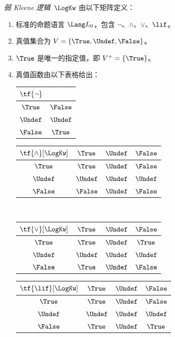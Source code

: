 \documentclass[../../../include/open-logic-section]{subfiles}
\begin{document}
\begin{defn}
\emph{弱 Kleene 逻辑}~$\LogKw$ 由以下矩阵定义：
\begin{enumerate}
  \item 标准的命题语言 $\Lang L_0$，包含
  $\lnot$、$\land$、$\lor$、$\lif$。
  \item 真值集合为 $V = \{\True, \Undef, \False\}$。
  \item $\True$ 是唯一的指定值，即 $V^+ = \{\True\}$。
  \item 真值函数由以下表格给出：
  \begin{center}
    \begin{tabular}{c|c}
      $\tf{\lnot}$ & \\
      \hline
      $\True$ & $\False$ \\
      $\Undef$ & $\Undef$ \\
      $\False$ & $\True$
    \end{tabular}
    \quad
    \begin{tabular}{c|ccc}
      $\tf{\land}[\LogKw]$ & $\True$ & $\Undef$ & $\False$ \\
      \hline
      $\True$ & $\True$ & $\Undef$ & $\False$ \\
      $\Undef$ & $\Undef$ & $\Undef$ & $\Undef$\\
      $\False$ & $\False$ & $\Undef$ & $\False$
    \end{tabular}
    \\[2ex]
    \begin{tabular}{c|ccc}
      $\tf{\lor}[\LogKw]$ & $\True$ & $\Undef$ & $\False$ \\
      \hline
      $\True$ & $\True$ & $\Undef$ & $\True$ \\
      $\Undef$ & $\Undef$ & $\Undef$ & $\Undef$ \\
      $\False$ & $\True$ & $\Undef$ & $\False$
    \end{tabular}
    \quad
    \begin{tabular}{c|ccc}
      $\tf{\lif}[\LogKw]$ & $\True$ & $\Undef$ & $\False$ \\
      \hline
      $\True$ & $\True$ & $\Undef$ & $\False$ \\
      $\Undef$ & $\Undef$ & $\Undef$ & $\Undef$  \\
      $\False$ & $\True$ & $\Undef$ & $\True$
    \end{tabular}
  \end{center}
\end{enumerate}
\end{defn}
\end{document}
